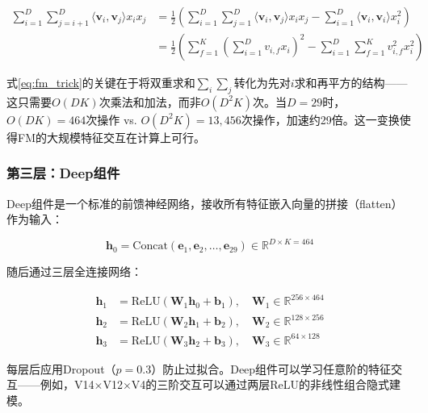 \begin{equation}
\begin{aligned}
\sum_{i=1}^{D}\sum_{j=i+1}^{D} \langle \mathbf{v}_i, \mathbf{v}_j \rangle x_i x_j
&= \frac{1}{2}\left(\sum_{i=1}^{D}\sum_{j=1}^{D} \langle \mathbf{v}_i, \mathbf{v}_j \rangle x_i x_j - \sum_{i=1}^{D} \langle \mathbf{v}_i, \mathbf{v}_i \rangle x_i^2 \right) \\
&= \frac{1}{2}\left( \sum_{f=1}^{K}\left(\sum_{i=1}^{D} v_{i,f} x_i\right)^2 - \sum_{i=1}^{D}\sum_{f=1}^{K} v_{i,f}^2 x_i^2 \right)
\end{aligned}
\label{eq:fm_trick}
\end{equation}

式\eqref{eq:fm_trick}的关键在于将双重求和$\sum_i\sum_j$转化为先对$i$求和再平方的结构——这只需要$O(DK)$次乘法和加法，而非$O(D^2K)$次。当$D=29$时，$O(DK)=464$次操作 vs. $O(D^2K)=13,456$次操作，加速约29倍。这一变换使得FM的大规模特征交互在计算上可行。

\subsubsection{第三层：Deep组件}

Deep组件是一个标准的前馈神经网络，接收所有特征嵌入向量的拼接（flatten）作为输入：

\begin{equation}
\mathbf{h}_0 = \mathrm{Concat}(\mathbf{e}_1, \mathbf{e}_2, \dots, \mathbf{e}_{29}) \in \mathbb{R}^{D \times K = 464}
\end{equation}

随后通过三层全连接网络：

\begin{equation}
\begin{aligned}
\mathbf{h}_1 &= \mathrm{ReLU}(\mathbf{W}_1 \mathbf{h}_0 + \mathbf{b}_1), \quad \mathbf{W}_1 \in \mathbb{R}^{256 \times 464} \\
\mathbf{h}_2 &= \mathrm{ReLU}(\mathbf{W}_2 \mathbf{h}_1 + \mathbf{b}_2), \quad \mathbf{W}_2 \in \mathbb{R}^{128 \times 256} \\
\mathbf{h}_3 &= \mathrm{ReLU}(\mathbf{W}_3 \mathbf{h}_2 + \mathbf{b}_3), \quad \mathbf{W}_3 \in \mathbb{R}^{64 \times 128}
\end{aligned}
\end{equation}

每层后应用Dropout（$p=0.3$）防止过拟合。Deep组件可以学习任意阶的特征交互——例如，V14$\times$V12$\times$V4的三阶交互可以通过两层ReLU的非线性组合隐式建模。

